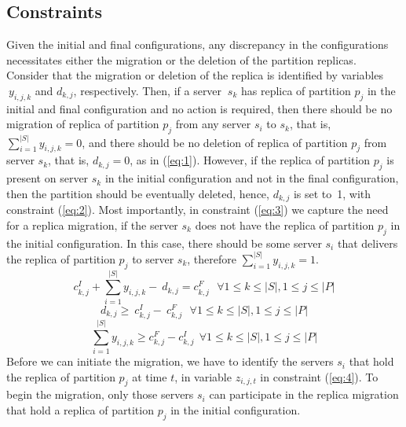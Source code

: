 \subsection{Constraints}
Given the initial and final configurations, any discrepancy in the configurations necessitates either the migration or the deletion of the partition replicas. Consider that the migration or deletion of the replica is identified by variables
${\ y}_{i,j,k}$  and $d_{k,j}$, respectively. Then, if a server $\
s_k$ has replica of partition $p_j$ in the initial and final configuration and no action is required, then there should be no migration of replica of partition  $p_j$  from any server $s_{i}$ to $s_{k}$, that is, $\sum_{i=1}^{\vert{}S\vert{}}y_{i,j,k}=0$,  and there should be no deletion of replica of partition $p_{j}$ from server $s_{k}$, that is,  $d_{k,j}=0$, as in (\ref{eq:1}).  However, if the replica of partition $p_{j}$ is present on server $s_{k}$ in the initial configuration and not in the final configuration, then the partition should be eventually deleted, hence, $d_{k,j}$ is set to~1, with constraint (\ref{eq:2}). Most importantly, in constraint (\ref{eq:3}) we capture the need for a replica migration, if the server $s_{k}$ does not have the replica of partition $p_{j}$ in the initial configuration. In this case, there should be some server $s_{i}$ that delivers the replica of partition $p_{j}$ to server $s_{k}$, therefore $\sum_{i=1}^{\vert{}S\vert{}}y_{i,j,k}=1$.
\begin{equation}
c_{k,j}^I+\sum_{i=1}^{\left\vert{}S\right\vert{}}y_{i,j,k}-\ d_{k,j}=c_{k,j}^F \ \ \ \forall{}1\leq{}k\leq{}\left\vert{}S\right\vert{},1\leq{}j\leq{}\left\vert{}P\right\vert{}
\label{eq:1}
\end{equation}
\begin{equation}
d_{k,j}\geq{}\ c_{k,j}^I-\ c_{k,j}^F \ \ \ \forall{}1\leq{}k\leq{}\left\vert{}S\right\vert{},1\leq{}j\leq{}\left\vert{}P\right\vert{}
\label{eq:2}
\end{equation}
\begin{equation}
\sum_{i=1}^{\left\vert{}S\right\vert{}}y_{i,j,k}\geq{}c_{k,j}^F-c_{k,j}^I\ \ \forall{}1\leq{}k\leq{}\left\vert{}S\right\vert{},1\leq{}j\leq{}\left\vert{}P\right\vert{}
\label{eq:3}
\end{equation}
Before we can initiate the migration, we have to identify the servers $s_{i}$ that hold the replica of partition $p_{j}$ at time $t$, in variable $z_{i,j,t}$ in constraint (\ref{eq:4}). To begin the migration, only those servers $s_{i}$ can participate in the replica migration that hold a replica of partition $p_{j}$ in the initial configuration.
